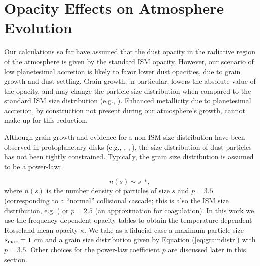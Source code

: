 \documentclass[apj]{emulateapj}
\begin{document}
%
%


\section{Opacity Effects on Atmosphere Evolution}
\label{sec:opacity}


Our calculations so far have assumed that the dust opacity in the radiative region of the atmosphere is given by the standard ISM opacity. However, our scenario of low planetesimal accretion is likely to favor lower dust opacities, due to grain growth and dust settling. Grain growth, in particular, lowers the absolute value of the opacity, and may change the particle size distribution when compared to the standard ISM size distribution (e.g., \citealt{pollack85}). Enhanced metallicity due to planetesimal accretion, by construction not present during our atmosphere's growth, cannot make up for this reduction.


Although grain growth and evidence for a non-ISM size distribution have been observed in protoplanetary disks (e.g., \citealt{beckwith90}, \citealt{beckwith91}, \citealt{perez12}), the size distribution of dust particles has not been tightly constrained. Typically, the grain size distribution is assumed to be a power-law: 

\begin{equation}
\label{eq:graindistr}
n(s) \sim s^{-p},
\end{equation}
where $n(s)$ is the number density of particles of size $s$ and $p=3.5$ (corresponding to a ``normal'' collisional cascade; this is also the ISM size distribution, e.g. \citealt{pollack85}) or $p=2.5$ (an approximation for coagulation). In this work we use the  \citet{dalessio01} frequency-dependent opacity tables to obtain the temperature-dependent Rosseland mean opacity $\kappa$. We take as a fiducial case a maximum particle size $s_{\rm max}=1$ cm and a grain size distribution given by Equation (\ref{eq:graindistr}) with $p=3.5$. Other choices for the power-law coefficient $p$ are discussed later in this section. 
\end{document}
